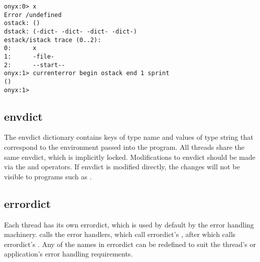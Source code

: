 \begin{description}
\begin{description}
\begin{verbatim}
onyx:0> x
Error /undefined
ostack: ()
dstack: (-dict- -dict- -dict- -dict-)
estack/istack trace (0..2):
0:      x
1:      -file-
2:      --start--
onyx:1> currenterror begin ostack end 1 sprint
()
onyx:1>
		\end{verbatim}
	\end{description}
\end{description}

\subsection{envdict}
\label{sec:envdict}

The envdict dictionary contains keys of type name and values of type string that
correspond to the environment passed into the program.  All threads share the
same envdict, which is implicitly locked.  Modifications to envdict should be
made via the  and
 operators.  If envdict is
modified directly, the changes will not be visible to programs such as
.

\subsection{errordict}
\label{sec:errordict}

Each thread has its own errordict, which is used by default by the error
handling machinery.   calls the
error handlers, which call errordict's
, after which
 calls errordict's
.  Any of the names in errordict can
be redefined to suit the thread's or application's error handling requirements.

